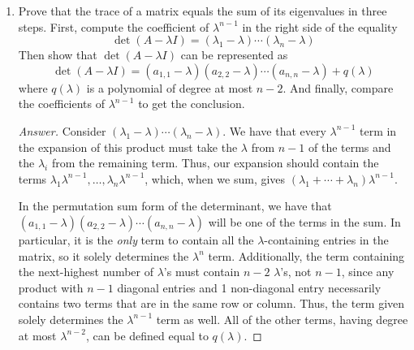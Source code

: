 \documentclass[../psets.tex]{subfiles}
\begin{document}
\begin{enumerate}[label={\textbf{1.\arabic*.}}]
\begin{proof}[Answer]
        We can row reduce $A$ to an upper triangular matrix $A_r$ without changing its determinant. We know that the determinant of the row-reduced matrix is equal to the product of its diagonal entries, and we know that the product of the diagonal entries of an upper-triangular matrix is equal to the product of its eigenvalues, so therefore, the determinant of $A$ is equal to the product of the eigenvalues.
    \end{proof}
    \item Prove that the trace of a matrix equals the sum of its eigenvalues in three steps. First, compute the coefficient of $\lambda^{n-1}$ in the right side of the equality
    \begin{equation*}
        \det(A-\lambda I) = (\lambda_1-\lambda)\cdots(\lambda_n-\lambda)
    \end{equation*}
    Then show that $\det(A-\lambda I)$ can be represented as
    \begin{equation*}
        \det(A-\lambda I) = (a_{1,1}-\lambda)(a_{2,2}-\lambda)\cdots(a_{n,n}-\lambda)+q(\lambda)
    \end{equation*}
    where $q(\lambda)$ is a polynomial of degree at most $n-2$. And finally, compare the coefficients of $\lambda^{n-1}$ to get the conclusion.
    \begin{proof}[Answer]
        Consider $(\lambda_1-\lambda)\cdots(\lambda_n-\lambda)$. We have that every $\lambda^{n-1}$ term in the expansion of this product must take the $\lambda$ from $n-1$ of the terms and the $\lambda_i$ from the remaining term. Thus, our expansion should contain the terms $\lambda_1\lambda^{n-1},\dots,\lambda_n\lambda^{n-1}$, which, when we sum, gives $(\lambda_1+\cdots+\lambda_n)\lambda^{n-1}$.\par
        In the permutation sum form of the determinant, we have that $(a_{1,1}-\lambda)(a_{2,2}-\lambda)\cdots(a_{n,n}-\lambda)$ will be one of the terms in the sum. In particular, it is the \emph{only} term to contain all the $\lambda$-containing entries in the matrix, so it solely determines the $\lambda^n$ term. Additionally, the term containing the next-highest number of $\lambda$'s must contain $n-2$ $\lambda$'s, not $n-1$, since any product with $n-1$ diagonal entries and 1 non-diagonal entry necessarily contains two terms that are in the same row or column. Thus, the term given solely determines the $\lambda^{n-1}$ term as well. All of the other terms, having degree at most $\lambda^{n-2}$, can be defined equal to $q(\lambda)$.\par

\end{proof}
\end{enumerate}
\end{document}
